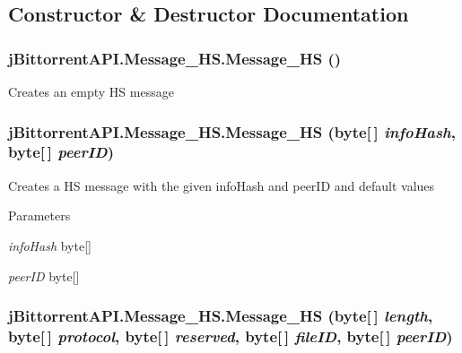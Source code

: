 \subsection{Constructor \& Destructor Documentation}
\hypertarget{classj_bittorrent_a_p_i_1_1_message___h_s_a1c67b8552e5e64459a83d5947b69bd34}{
\subsubsection[{Message\_\-HS}]{\setlength{\rightskip}{0pt plus 5cm}jBittorrentAPI.Message\_\-HS.Message\_\-HS ()}}
\label{classj_bittorrent_a_p_i_1_1_message___h_s_a1c67b8552e5e64459a83d5947b69bd34}
Creates an empty HS message \hypertarget{classj_bittorrent_a_p_i_1_1_message___h_s_a25dc27ff305744055c516dd90835c2c7}{
\subsubsection[{Message\_\-HS}]{\setlength{\rightskip}{0pt plus 5cm}jBittorrentAPI.Message\_\-HS.Message\_\-HS (byte\mbox{[}$\,$\mbox{]} {\em infoHash}, \/  byte\mbox{[}$\,$\mbox{]} {\em peerID})}}
\label{classj_bittorrent_a_p_i_1_1_message___h_s_a25dc27ff305744055c516dd90835c2c7}
Creates a HS message with the given infoHash and peerID and default values 
\begin{DoxyParams}{Parameters}
\item[{\em infoHash}]byte\mbox{[}\mbox{]} \item[{\em peerID}]byte\mbox{[}\mbox{]} \end{DoxyParams}
\hypertarget{classj_bittorrent_a_p_i_1_1_message___h_s_a720a309bdaf8566f98a351f7e8d98c05}{
\subsubsection[{Message\_\-HS}]{\setlength{\rightskip}{0pt plus 5cm}jBittorrentAPI.Message\_\-HS.Message\_\-HS (byte\mbox{[}$\,$\mbox{]} {\em length}, \/  byte\mbox{[}$\,$\mbox{]} {\em protocol}, \/  byte\mbox{[}$\,$\mbox{]} {\em reserved}, \/  byte\mbox{[}$\,$\mbox{]} {\em fileID}, \/  byte\mbox{[}$\,$\mbox{]} {\em peerID})}}
